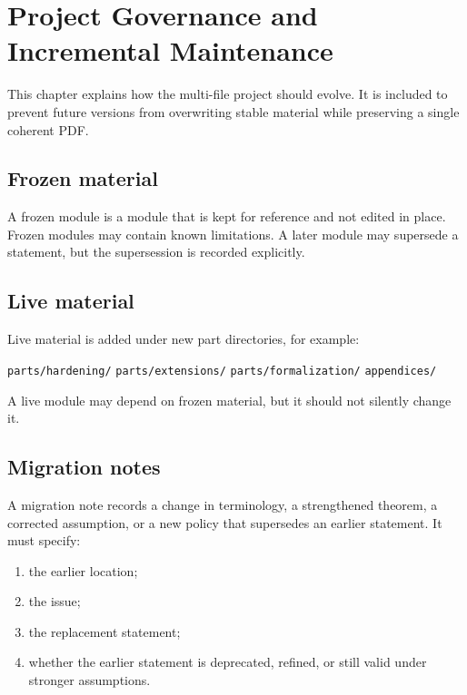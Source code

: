 \chapter{Project Governance and Incremental Maintenance}

This chapter explains how the multi-file project should evolve. It is included to prevent future versions from overwriting stable material while preserving a single coherent PDF.

\section{Frozen material}

A frozen module is a module that is kept for reference and not edited in place. Frozen modules may contain known limitations. A later module may supersede a statement, but the supersession is recorded explicitly.

\section{Live material}

Live material is added under new part directories, for example:
\begin{center}
\texttt{parts/hardening/}\qquad
\texttt{parts/extensions/}\qquad
\texttt{parts/formalization/}\qquad
\texttt{appendices/}
\end{center}
A live module may depend on frozen material, but it should not silently change it.

\section{Migration notes}

\begin{definition}
A migration note records a change in terminology, a strengthened theorem, a corrected assumption, or a new policy that supersedes an earlier statement. It must specify:
\begin{enumerate}
  \item the earlier location;
  \item the issue;
  \item the replacement statement;
  \item whether the earlier statement is deprecated, refined, or still valid under stronger assumptions.
\end{enumerate}
\end{definition}

